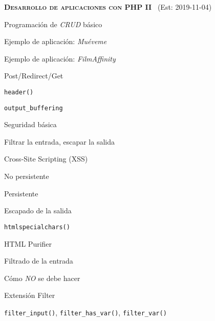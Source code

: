 \begin{longenum}
\begin{longenum}
\begin{longenum}
\begin{longenum}
            \end{longenum}
        \end{longenum}
    \end{longenum}
    \item \textbf{\textsc{Desarrollo de aplicaciones con PHP II}} \ (Est: 2019-11-04)
    \begin{longenum}
        \item Programación de \textit{CRUD} básico
        \begin{longenum}
            \item Ejemplo de aplicación: \textit{Muéveme}
            \item Ejemplo de aplicación: \textit{FilmAffinity}
        \end{longenum}
        \item Post/Redirect/Get
        \item \texttt{header()}
        \begin{longenum}
            \item \texttt{output\_buffering}
        \end{longenum}
        \item Seguridad básica
        \begin{longenum}
            \item Filtrar la entrada, escapar la salida
            \item Cross-Site Scripting (XSS)
            \begin{longenum}
                \item No persistente
                \item Persistente
                \item Escapado de la salida
                \begin{longenum}
                    \item \texttt{htmlspecialchars()}
                    \item HTML Purifier
                \end{longenum}
            \end{longenum}
            \item Filtrado de la entrada
            \begin{longenum}
                \item Cómo \textit{NO} se debe hacer
                \item Extensión Filter
                \begin{longenum}
                    \item \texttt{filter\_input()}, \texttt{filter\_has\_var()}, \texttt{filter\_var()}

\end{longenum}
\end{longenum}
\end{longenum}
\end{longenum}
\end{longenum}
